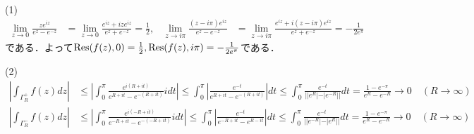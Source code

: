 \documentclass[
		book,
		head_space=20mm,
		foot_space=20mm,
		gutter=10mm,
		line_length=190mm
]{jlreq}
\begin{document}
(1)\begin{align}
	\lim_{z \to 0}\frac{ze^{iz}}{e^z-e^{-z}}&=\lim_{z\to 0} \frac{e^{iz}+ize^{iz}}{e^z+e^{-z}}=\frac{1}{2} , & \lim_{z \to i\pi} \frac{(z-i\pi)e^{iz}}{e^z-e^{-z}}&=\lim_{z\to i\pi} \frac{e^{iz}+i(z-i\pi)e^{iz}}{e^z+e^{-z}}=-\frac{1}{2e^{\pi}}
\end{align}
である．よって$\Res(f(z),0)=\frac{1}{2},\Res(f(z),i\pi)=-\frac{1}{2e^{\pi}}$である．

(2)\begin{align}
	\left| \int_{\Gamma_R^+}f(z)dz \right|&\le \left| \int_0^\pi \frac{e^{i(R+it)}}{e^{R+it}-e^{-(R+it)}}idt \right|\le\int_0^\pi \left| \frac{e^{-t}}{e^{R+it}-e^{-(R+it)}} \right|dt\le \int_0^\pi \frac{e^{-t}}{||e^R|-|e^{-R}||}dt=\frac{1-e^{-\pi}}{e^R-e^{-R}}\rightarrow 0\quad (R\rightarrow \infty)\\
	\left| \int_{\Gamma_R^-}f(z)dz \right|&\le \left| \int_0^\pi \frac{e^{i(-R+it)}}{e^{-R+it}-e^{-(-R+it)}}idt \right|\le\int_0^\pi \left| \frac{e^{-t}}{e^{-R+it}-e^{R-it}} \right|dt\le \int_0^\pi \frac{e^{-t}}{||e^{-R}|-|e^{R}||}dt=\frac{1-e^{-\pi}}{e^R-e^{-R}}\rightarrow 0\quad (R\rightarrow \infty)
\end{align}
\end{document}
